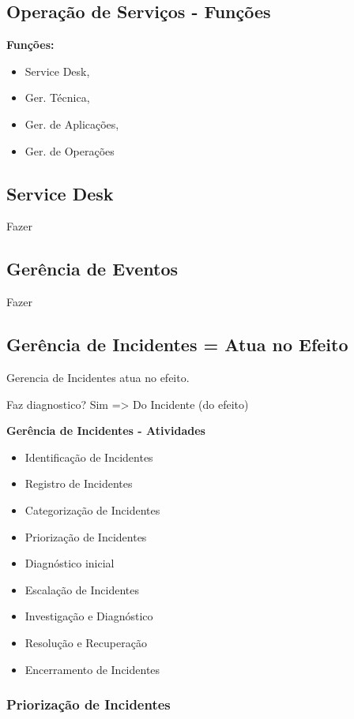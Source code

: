 \subsection{Operação de Serviços - Funções}


\textbf{Funções:}
\begin{itemize}
	\item Service Desk,
	\item Ger. Técnica,
	\item Ger. de Aplicações,
	\item Ger. de Operações
\end{itemize}

\subsection{Service Desk}

Fazer

\subsection{Gerência de Eventos}

Fazer

\subsection{Gerência de Incidentes = Atua no Efeito}

Gerencia de Incidentes atua no efeito. 

Faz diagnostico? Sim => Do Incidente (do efeito)

\textbf{Gerência de Incidentes - Atividades}
\begin{itemize}
	\item Identificação de Incidentes
	\item Registro de Incidentes
	\item Categorização de Incidentes
	\item Priorização de Incidentes
	\item Diagnóstico inicial
	\item Escalação de Incidentes
	\item Investigação e Diagnóstico
	\item Resolução e Recuperação
	\item Encerramento de Incidentes
\end{itemize}

\subsubsection{Priorização de Incidentes}

